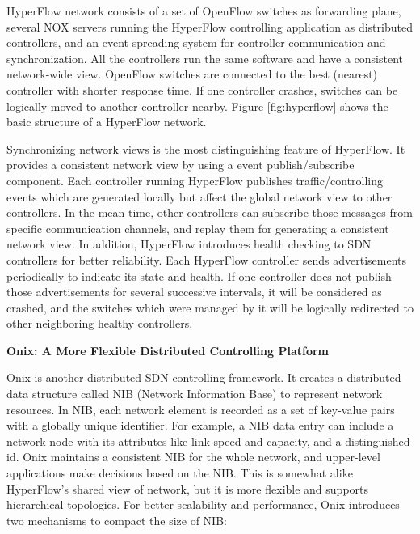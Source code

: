 \documentclass[english]{tktltiki}
\begin{document}
HyperFlow network consists of a set of OpenFlow switches as forwarding plane, several NOX servers running the HyperFlow controlling application as distributed controllers, and an event spreading system for controller communication and synchronization. All the controllers run the same software and have a consistent network-wide view. OpenFlow switches are connected to the best (nearest) controller with shorter response time. If one controller crashes, switches can be logically moved to another controller nearby. Figure \ref{fig:hyperflow} shows the basic structure of a HyperFlow network.

Synchronizing network views is the most distinguishing feature of HyperFlow. It provides a consistent network view by using a event publish/subscribe component. Each controller running HyperFlow publishes traffic/controlling events which are generated locally but affect the global network view to other controllers. In the mean time, other controllers can subscribe those messages from specific communication channels, and replay them for generating a consistent network view. In addition, HyperFlow introduces health checking to SDN controllers for better reliability. Each HyperFlow controller sends advertisements periodically to indicate its state and health. If one controller does not publish those advertisements for several successive intervals, it will be considered as crashed, and the switches which were managed by it will be logically redirected to other neighboring healthy controllers.

\vspace{1mm}

\textbf{Onix: A More Flexible Distributed Controlling Platform}

\vspace{1mm}

Onix is another distributed SDN controlling framework. It creates a distributed data structure called NIB (Network Information Base) to represent network resources. In NIB, each network element is recorded as a set of key-value pairs with a globally unique identifier. For example, a NIB data entry can include a network node with its attributes like link-speed and capacity, and a distinguished id. Onix maintains a consistent NIB for the whole network, and upper-level applications make decisions based on the NIB. This is somewhat alike HyperFlow's shared view of network, but it is more flexible and supports hierarchical topologies. For better scalability and performance, Onix introduces two mechanisms to compact the size of NIB: 
\end{document}
